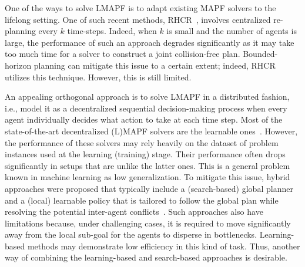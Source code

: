 \documentclass[letterpaper]{article} %
\begin{document}
One of the ways to solve LMAPF is to adapt existing MAPF solvers to the lifelong setting. One of such recent methods, RHCR~\cite{li2021lifelong}, involves centralized re-planning every $k$ time-steps. Indeed, when $k$ is small and the number of agents is large, the performance of such an approach degrades significantly as it may take too much time for a solver to construct a joint collision-free plan. Bounded-horizon planning can mitigate this issue to a certain extent; indeed, RHCR utilizes this technique. However, this is still limited.

An appealing orthogonal approach is to solve LMAPF in a distributed fashion, i.e., model it as a decentralized sequential decision-making process when every agent individually decides what action to take at each time step. Most of the state-of-the-art decentralized (L)MAPF solvers are the learnable ones~\cite{sartoretti2019primal,damani2021primal,ma2021distributed,Li2022MultiAgentPF}. However, the performance of these solvers may rely heavily on the dataset of problem instances used at the learning (training) stage. Their performance often drops significantly in setups that are unlike the latter ones. This is a general problem known in machine learning as low generalization. To mitigate this issue, hybrid approaches were proposed that typically include a (search-based) global planner and a (local) learnable policy that is tailored to follow the global plan while resolving the potential inter-agent conflicts~\cite{Wang2020,9340876}. Such approaches also have limitations because, under challenging cases, it is required to move significantly away from the local sub-goal for the agents to disperse in bottlenecks. Learning-based methods may demonstrate low efficiency in this kind of task. Thus, another way of combining the learning-based and search-based approaches is desirable.
\end{document}
